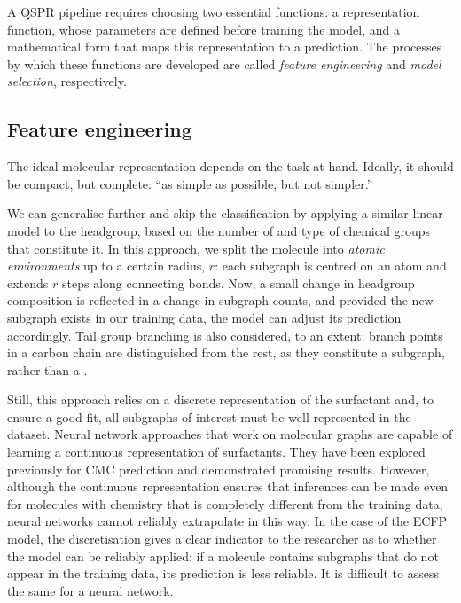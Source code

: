A QSPR pipeline requires choosing two essential functions: a representation
function, whose parameters are defined before training the model, and a
mathematical form that maps this representation to a prediction. The processes
by which these functions are developed are called \emph{feature engineering} and
\emph{model selection}, respectively.

\subsection{Feature engineering}

The ideal molecular representation depends on the task at hand. Ideally, it
should be compact, but complete: ``as simple as possible, but not simpler.''

We can generalise further and skip the classification by applying a similar
linear model to the headgroup, based on the number of and type of chemical
groups that constitute it. In this approach, we split the molecule into
\emph{atomic environments} up to a certain radius, $r$: each subgraph is centred
on an atom and extends $r$ steps along connecting bonds. Now, a small change in
headgroup composition is reflected in a change in subgraph counts, and provided
the new subgraph exists in our training data, the model can adjust its
prediction accordingly. Tail group branching is also considered, to an extent:
branch points in a carbon chain are distinguished from the rest, as they
constitute a  subgraph, rather than a .

Still, this approach relies on a discrete representation of the surfactant and,
to ensure a good fit, all subgraphs of interest must be well represented in the
dataset. Neural network approaches that work on molecular graphs are capable of
learning a continuous representation of surfactants. They have been explored
previously for CMC prediction and demonstrated promising results. However,
although the continuous representation ensures that inferences can be made even
for molecules with chemistry that is completely different from the training
data, neural networks cannot reliably extrapolate in this way. In the case of
the ECFP model, the discretisation gives a clear indicator to the researcher as
to whether the model can be reliably applied: if a molecule contains subgraphs
that do not appear in the training data, its prediction is less reliable. It is
difficult to assess the same for a neural network.